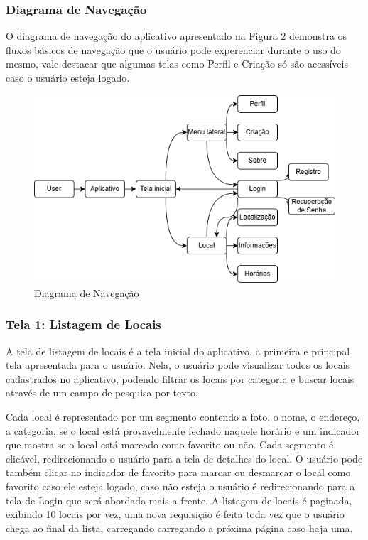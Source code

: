 \subsubsection{Diagrama de Navegação}

    O diagrama de navegação do aplicativo apresentado na Figura 2 demonstra os fluxos básicos de navegação que o usuário pode experenciar
    durante o uso do mesmo, vale destacar que algumas telas como Perfil e Criação só são acessíveis caso o usuário esteja logado.

    \begin{figure}[h]
        \centering
        \includegraphics[width=120mm,height=70mm]{imagens/navegacao.png}
        \caption{\scriptsize Diagrama de Navegação}
        \footnotesize  {}
        \label{fig:diagrama-navegacao}
    \end{figure}

    \FloatBarrier

\subsubsection{Tela 1: Listagem de Locais}

    A tela de listagem de locais é a tela inicial do aplicativo, a primeira e principal tela apresentada para o usuário. Nela, o usuário pode visualizar todos os locais cadastrados no aplicativo, podendo filtrar os locais por categoria e buscar locais através de um campo de pesquisa por texto. 
    
    Cada local é representado por um segmento contendo a foto, o nome, o endereço, a categoria, se o local está provavelmente fechado naquele horário e um indicador que mostra se o local está marcado como favorito ou não. Cada segmento é clicável, redirecionando o usuário para a tela de detalhes do local. O usuário pode também clicar no indicador de favorito para marcar ou desmarcar o local como favorito caso ele esteja logado, caso não esteja o usuário é redirecionando para a tela de Login que será abordada mais a frente. A listagem de locais é paginada, exibindo 10 locais por vez, uma nova requisição é feita toda vez que o usuário chega ao final da lista, carregando carregando a próxima página caso haja uma.

